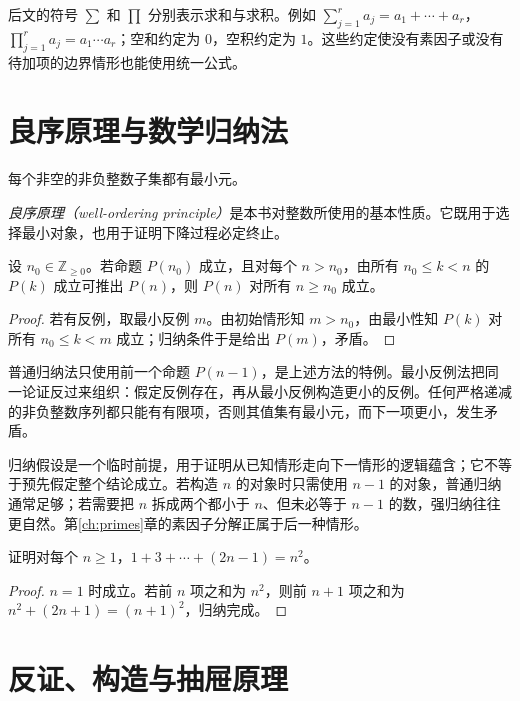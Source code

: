 后文的符号 $\sum$ 和 $\prod$ 分别表示求和与求积。例如 $\sum_{j=1}^r a_j=a_1+\cdots+a_r$，$\prod_{j=1}^r a_j=a_1\cdots a_r$；空和约定为 $0$，空积约定为 $1$。这些约定使没有素因子或没有待加项的边界情形也能使用统一公式。

\section{良序原理与数学归纳法}

\begin{axiom}[良序原理]
每个非空的非负整数子集都有最小元。
\end{axiom}

\emph{良序原理（well-ordering principle）}是本书对整数所使用的基本性质。它既用于选择最小对象，也用于证明下降过程必定终止。

\begin{theorem}
设 $n_0\in\mathbb Z_{\ge0}$。若命题 $P(n_0)$ 成立，且对每个 $n>n_0$，由所有 $n_0\le k<n$ 的 $P(k)$ 成立可推出 $P(n)$，则 $P(n)$ 对所有 $n\ge n_0$ 成立。
\end{theorem}
\begin{proof}
若有反例，取最小反例 $m$。由初始情形知 $m>n_0$，由最小性知 $P(k)$ 对所有 $n_0\le k<m$ 成立；归纳条件于是给出 $P(m)$，矛盾。
\end{proof}

普通归纳法只使用前一个命题 $P(n-1)$，是上述方法的特例。最小反例法把同一论证反过来组织：假定反例存在，再从最小反例构造更小的反例。任何严格递减的非负整数序列都只能有有限项，否则其值集有最小元，而下一项更小，发生矛盾。

归纳假设是一个临时前提，用于证明从已知情形走向下一情形的逻辑蕴含；它不等于预先假定整个结论成立。若构造 $n$ 的对象时只需使用 $n-1$ 的对象，普通归纳通常足够；若需要把 $n$ 拆成两个都小于 $n$、但未必等于 $n-1$ 的数，强归纳往往更自然。第\ref{ch:primes}章的素因子分解正属于后一种情形。

\begin{example}
证明对每个 $n\ge1$，$1+3+\cdots+(2n-1)=n^2$。
\end{example}
\begin{proof}
$n=1$ 时成立。若前 $n$ 项之和为 $n^2$，则前 $n+1$ 项之和为 $n^2+(2n+1)=(n+1)^2$，归纳完成。
\end{proof}

\section{反证、构造与抽屉原理}


